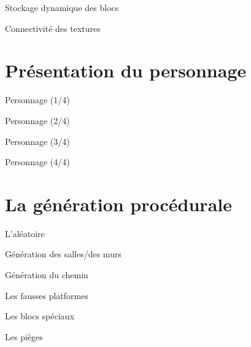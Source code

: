 \documentclass{beamer}
\begin{document}
{\begin{frame}{Stockage dynamique des blocs}
\end{frame}

\begin{frame}{Connectivité des textures}

\end{frame}

\section{Présentation du personnage}
\begin{frame}{Personnage (1/4)}

\end{frame}

\begin{frame}{Personnage (2/4)}

\end{frame}

\begin{frame}{Personnage (3/4)}

\end{frame}

\begin{frame}{Personnage (4/4)}

\end{frame}

\section{La génération procédurale}
\begin{frame}{L'aléatoire}

\end{frame}

\begin{frame}{Génération des salles/des murs}

\end{frame}

\begin{frame}{Génération du chemin}

\end{frame}

\begin{frame}{Les fausses platformes}

\end{frame}

\begin{frame}{Les blocs spéciaux}

\end{frame}

\begin{frame}{Les pièges}


\end{frame}}
\end{document}
